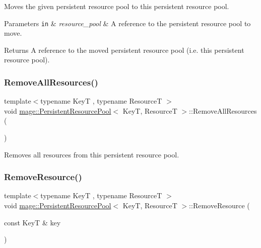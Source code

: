 Moves the given persistent resource pool to this persistent resource pool.


\begin{DoxyParams}[1]{Parameters}
\mbox{\tt in}  & {\em resource\+\_\+pool} & A reference to the persistent resource pool to move. \\
\hline
\end{DoxyParams}
\begin{DoxyReturn}{Returns}
A reference to the moved persistent resource pool (i.\+e. this persistent resource pool). 
\end{DoxyReturn}
\hypertarget{classmage_1_1_persistent_resource_pool_ae8b7a0b7d2f6adefc725d08367b8a29f}{}\label{classmage_1_1_persistent_resource_pool_ae8b7a0b7d2f6adefc725d08367b8a29f} 
\subsubsection{\texorpdfstring{Remove\+All\+Resources()}{RemoveAllResources()}}
{\footnotesize\ttfamily template$<$typename KeyT , typename ResourceT $>$ \\
void \hyperlink{classmage_1_1_persistent_resource_pool}{mage\+::\+Persistent\+Resource\+Pool}$<$ KeyT, ResourceT $>$\+::Remove\+All\+Resources (\begin{DoxyParamCaption}{ }\end{DoxyParamCaption})}

Removes all resources from this persistent resource pool. \hypertarget{classmage_1_1_persistent_resource_pool_ab9f233a5510cf9dc35454b7f3b8b415f}{}\label{classmage_1_1_persistent_resource_pool_ab9f233a5510cf9dc35454b7f3b8b415f} 
\subsubsection{\texorpdfstring{Remove\+Resource()}{RemoveResource()}}
{\footnotesize\ttfamily template$<$typename KeyT , typename ResourceT $>$ \\
void \hyperlink{classmage_1_1_persistent_resource_pool}{mage\+::\+Persistent\+Resource\+Pool}$<$ KeyT, ResourceT $>$\+::Remove\+Resource (\begin{DoxyParamCaption}\item[{const KeyT \&}]{key }\end{DoxyParamCaption})}


